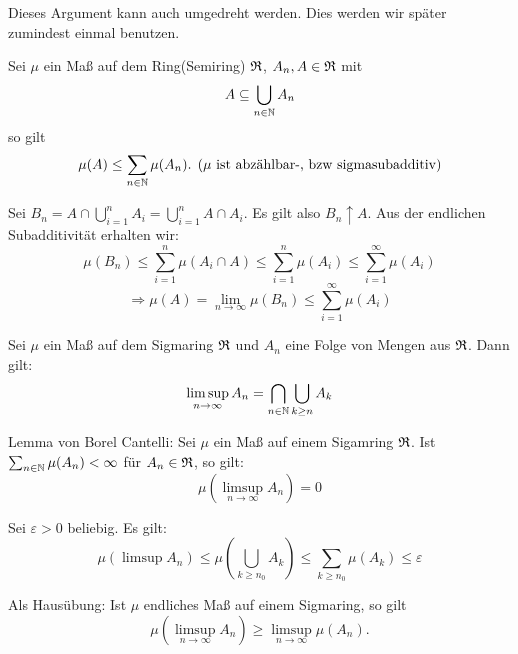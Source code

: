 			\begin{bem}
				Dieses Argument kann auch umgedreht werden. Dies werden wir später zumindest einmal benutzen.
			\end{bem}
			
			\begin{satz}
				Sei $\mu$ ein Maß auf dem Ring(Semiring) $\mathfrak{R}$, $A_n, A\in\mathfrak{R}$ mit
				\[ A\subseteq \bigcup_{n\in\mathbb{N}} A_n \]
				so gilt
				\[ \mu(A)\le \sum_{n\in\mathbb{N}}\mu(A_n).\:\:(\mu\text{ ist abzählbar-, bzw sigmasubadditiv}) \]
			\end{satz}
			
			\begin{bew}
				Sei $B_n=A\cap\bigcup_{i=1}^n A_i=\bigcup_{i=1}^n A\cap A_i$. Es gilt also $B_n\uparrow A$. Aus der endlichen Subadditivität erhalten wir:
				\[ \mu(B_n)\le\sum_{i=1}^n \mu(A_i\cap A)\le \sum_{i=1}^n\mu(A_i)\le \sum_{i=1}^\infty \mu(A_i) \]
				\[ \Rightarrow \mu(A)=\lim_{n\to\infty} \mu(B_n)\le\sum_{i=1}^\infty \mu(A_i) \]
			\end{bew}
			
			\begin{satz}
				Sei $\mu$ ein Maß auf dem Sigmaring $\mathfrak{R}$ und $A_n$ eine Folge von Mengen aus $\mathfrak{R}$. Dann gilt:
				\[ \limsup_{n\to\infty} A_n = \bigcap_{n\in\mathbb{N}}\bigcup_{k\ge n} A_k \]
			\end{satz}
			
			\begin{satz}
				Lemma von Borel Cantelli:\newline
				Sei $\mu$ ein Maß auf einem Sigamring $\mathfrak{R}$. Ist $\sum_{n\in\mathbb{N}} \mu(A_n)<\infty$ für $A_n\in\mathfrak{R}$, so gilt:
				\[ \mu(\limsup_{n\to\infty} A_n)=0 \]
			\end{satz}
			
			\begin{bew}
				Sei $\varepsilon>0$ beliebig. Es gilt:
				\[ \mu(\limsup A_n)\le \mu\left(\bigcup_{k\ge n_0} A_k\right)\le \sum_{k\ge n_0} \mu(A_k)\le \varepsilon \]
				\arge
			\end{bew}
			
			\begin{bem}
				Als Hausübung: Ist $\mu$ endliches Maß auf einem Sigmaring, so gilt
				\[ \mu(\limsup_{n\to\infty} A_n)\ge \limsup_{n\to\infty} \mu(A_n). \]
			\end{bem}
			
